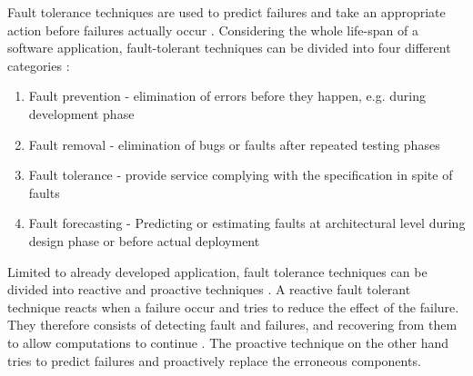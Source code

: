 \documentclass{cslthse-msc}
\begin{document}
Fault tolerance techniques are used to predict failures and take an appropriate action before failures actually occur
\cite{faultToleranceChallenges}. Considering the whole life-span of a software application, fault-tolerant techniques can be divided into four different categories \cite{surveyReliabilityDistr}:
\begin{enumerate}
\item Fault prevention - elimination of errors before they happen, e.g. during development phase
\item Fault removal - elimination of bugs or faults after repeated testing phases
\item Fault tolerance - provide service complying with the specification in spite of faults
\item Fault forecasting - Predicting or estimating faults at architectural level during design phase or before actual deployment
\end{enumerate}

Limited to already developed application, fault tolerance techniques can be divided into reactive and proactive techniques \cite{faultToleranceChallenges}. A reactive fault tolerant technique reacts when a failure occur and tries to reduce the effect of the failure. They therefore consists of detecting fault and failures, and recovering from them to allow computations to continue \cite{relGridSystems}. The proactive technique on the other hand tries to predict failures and proactively replace the erroneous components. 
\end{document}
